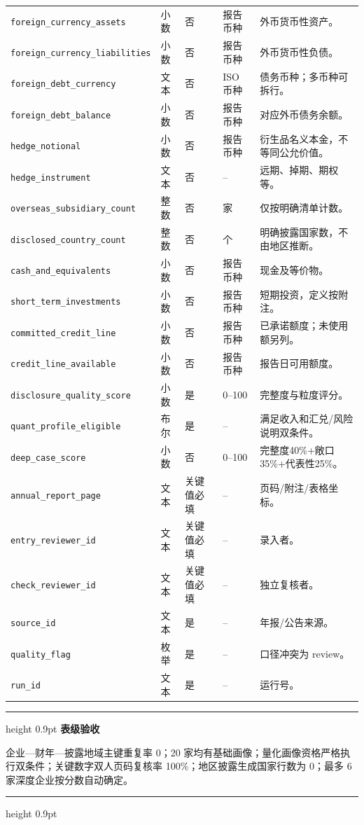 \documentclass[UTF8,fontset=windows,12pt,openany]{ctexbook}
\newenvironment{gatebox}[1][]{%
  \par\medskip\noindent\begin{center}\begin{minipage}{0.93\textwidth}%
  \color{GoldLine}\hrule height 0.9pt\vspace{0.45em}%
  \textbf{#1}\par\smallskip\color{black}%
}{%
  \par\vspace{0.35em}\color{GoldLine}\hrule height 0.9pt%
  \end{minipage}\end{center}\medskip%
}
\newcommand{\Field}[1]{{\small\nolinkurl{#1}}}
\begin{document}
\begin{landscape}
\begin{longtable}{p{4.2cm}p{2.2cm}p{2.3cm}p{2.7cm}p{7.0cm}}
\Field{foreign_currency_assets} & 小数 & 否 & 报告币种 & 外币货币性资产。\\
\Field{foreign_currency_liabilities} & 小数 & 否 & 报告币种 & 外币货币性负债。\\
\Field{foreign_debt_currency} & 文本 & 否 & ISO 币种 & 债务币种；多币种可拆行。\\
\Field{foreign_debt_balance} & 小数 & 否 & 报告币种 & 对应外币债务余额。\\
\Field{hedge_notional} & 小数 & 否 & 报告币种 & 衍生品名义本金，不等同公允价值。\\
\Field{hedge_instrument} & 文本 & 否 & -- & 远期、掉期、期权等。\\
\Field{overseas_subsidiary_count} & 整数 & 否 & 家 & 仅按明确清单计数。\\
\Field{disclosed_country_count} & 整数 & 否 & 个 & 明确披露国家数，不由地区推断。\\
\Field{cash_and_equivalents} & 小数 & 否 & 报告币种 & 现金及等价物。\\
\Field{short_term_investments} & 小数 & 否 & 报告币种 & 短期投资，定义按附注。\\
\Field{committed_credit_line} & 小数 & 否 & 报告币种 & 已承诺额度；未使用额另列。\\
\Field{credit_line_available} & 小数 & 否 & 报告币种 & 报告日可用额度。\\
\Field{disclosure_quality_score} & 小数 & 是 & 0--100 & 完整度与粒度评分。\\
\Field{quant_profile_eligible} & 布尔 & 是 & -- & 满足收入和汇兑/风险说明双条件。\\
\Field{deep_case_score} & 小数 & 否 & 0--100 & 完整度40\%+敞口35\%+代表性25\%。\\
\Field{annual_report_page} & 文本 & 关键值必填 & -- & 页码/附注/表格坐标。\\
\Field{entry_reviewer_id} & 文本 & 关键值必填 & -- & 录入者。\\
\Field{check_reviewer_id} & 文本 & 关键值必填 & -- & 独立复核者。\\
\Field{source_id} & 文本 & 是 & -- & 年报/公告来源。\\
\Field{quality_flag} & 枚举 & 是 & -- & 口径冲突为 review。\\
\Field{run_id} & 文本 & 是 & -- & 运行号。\\
\bottomrule
\end{longtable}
\end{landscape}

\begin{gatebox}[表级验收]
企业—财年—披露地域主键重复率 0；20 家均有基础画像；量化画像资格严格执行双条件；关键数字双人页码复核率 100\%；地区披露生成国家行数为 0；最多 6 家深度企业按分数自动确定。
\end{gatebox}
\end{document}
